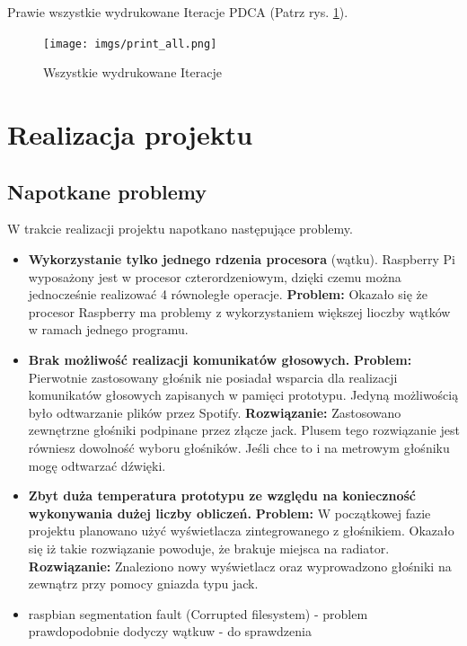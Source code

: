 \documentclass[a4paper,12pt,reqno]{article}
\begin{document}
Prawie wszystkie wydrukowane Iteracje PDCA (Patrz rys. \ref{PDCA_ALL}).

\begin{figure}[H]%
\centering
\texttt{[image: imgs/print\_all.png]}
\caption{Wszystkie wydrukowane Iteracje \cite{img_by_me} \label{PDCA_ALL}}
\quad
\end{figure}

\section{Realizacja projektu} \label{section:realizacja}
\subsection{Napotkane problemy}
W trakcie realizacji projektu napotkano następujące problemy.
\begin{itemize}
	\item \textbf{Wykorzystanie tylko jednego rdzenia procesora} (wątku). Raspberry Pi wyposażony jest w procesor czterordzeniowym, dzięki czemu można jednocześnie realizować 4 równoległe operacje. \newline \textbf{\textcolor{to_change}{Problem:}} \newline Okazało się że procesor Raspberry ma problemy z wykorzystaniem większej lioczby wątków w ramach jednego programu.
	\item \textbf{Brak możliwość realizacji komunikatów głosowych.} \newline \textbf{\textcolor{to_change}{Problem:}} \newline Pierwotnie zastosowany głośnik nie posiadał wsparcia dla realizacji komunikatów głosowych zapisanych w pamięci prototypu. Jedyną możliwością było odtwarzanie plików przez Spotify. \newline \textbf{\textcolor{to_change}{Rozwiązanie:}} \newline Zastosowano zewnętrzne głośniki podpinane przez złącze jack. \textcolor{new}{Plusem tego rozwiązanie jest równiesz dowolność wyboru głośników. Jeśli chce to i na metrowym głośniku mogę odtwarzać dźwięki.}
	\item \textbf{Zbyt duża temperatura prototypu ze względu na konieczność wykonywania dużej liczby obliczeń.} \newline \textbf{\textcolor{to_change}{Problem:}} \newline W początkowej fazie projektu planowano użyć wyświetlacza zintegrowanego z głośnikiem. Okazało się iż takie rozwiązanie powoduje, że brakuje miejsca na radiator. \newline \textbf{\textcolor{to_change}{Rozwiązanie:}} \newline Znaleziono nowy wyświetlacz oraz wyprowadzono głośniki na zewnątrz przy pomocy gniazda typu jack.
	\item raspbian segmentation fault (Corrupted filesystem) - problem prawdopodobnie dodyczy wątkuw - do sprawdzenia
\end{itemize}
\end{document}
